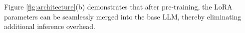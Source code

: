 Figure \ref{fig:architecture}(b) demonstrates that after pre-training, the LoRA parameters can be seamlessly merged into the base LLM, thereby eliminating additional inference overhead. 






